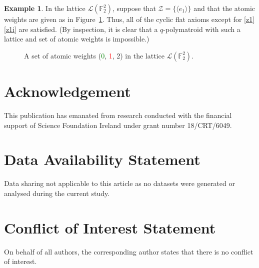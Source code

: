 \documentclass[a4paper,11pt,reqno]{article}
\theoremstyle{definition}
\newtheorem{example}[theorem]{{{Example}}}
\begin{document}
\begin{example}
    In the lattice $\mathcal{L}(\mathbb{F}_2^2)$, suppose that $\mathcal{Z}=\{\langle e_1\rangle\}$
    and that the atomic weights are given as in Figure~\ref{fig:z1i_counter}. Thus, all of the cyclic flat axioms except for \ref{z1}\ref{z1i} are satisfied. (By inspection, it is clear that a $q$-polymatroid with such a lattice and set of atomic weights is impossible.)
    
    \begin{figure}[h]
        \centering
        \caption{A set of atomic weights (\textcolor{green}{0}, \textcolor{red}{1}, 2) in the lattice $\mathcal{L}(\mathbb{F}_2^2)$.}
        \label{fig:z1i_counter}
    \end{figure}
\end{example}

\section*{Acknowledgement}
This publication has emanated from research
conducted with the financial support of Science Foundation Ireland under grant
number 18/CRT/6049.

\section*{Data Availability Statement}
Data sharing not applicable to this article as no datasets were generated or analysed during the current study.


\section*{Conflict of Interest Statement}
On behalf of all authors, the corresponding author states that there is no conflict of interest.


\newpage

 
\end{document}
